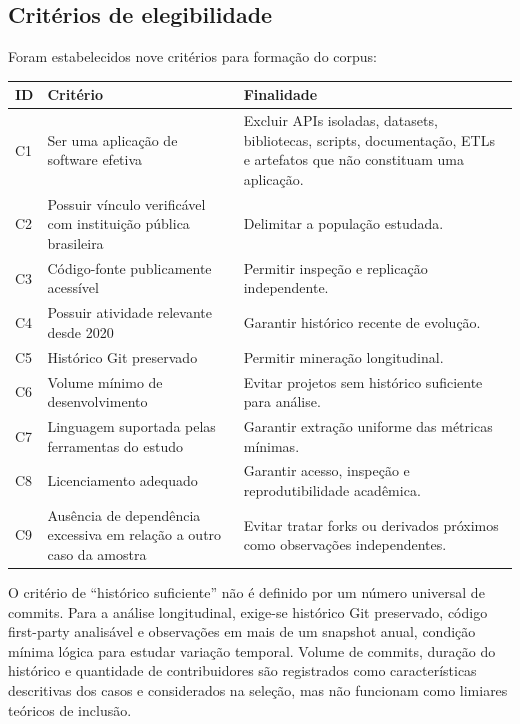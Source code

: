 \documentclass[12pt]{article}
\begin{document}
\subsection{Critérios de elegibilidade}

Foram estabelecidos nove critérios para formação do corpus:

\begin{longtable}{>{\raggedright\arraybackslash}p{1.2cm} >{\raggedright\arraybackslash}p{5.3cm} >{\raggedright\arraybackslash}p{8cm}}
\toprule
\textbf{ID} & \textbf{Critério} & \textbf{Finalidade} \\
\midrule
C1 & Ser uma aplicação de software efetiva & Excluir APIs isoladas, datasets, bibliotecas, scripts, documentação, ETLs e artefatos que não constituam uma aplicação. \\
C2 & Possuir vínculo verificável com instituição pública brasileira & Delimitar a população estudada. \\
C3 & Código-fonte publicamente acessível & Permitir inspeção e replicação independente. \\
C4 & Possuir atividade relevante desde 2020 & Garantir histórico recente de evolução. \\
C5 & Histórico Git preservado & Permitir mineração longitudinal. \\
C6 & Volume mínimo de desenvolvimento & Evitar projetos sem histórico suficiente para análise. \\
C7 & Linguagem suportada pelas ferramentas do estudo & Garantir extração uniforme das métricas mínimas. \\
C8 & Licenciamento adequado & Garantir acesso, inspeção e reprodutibilidade acadêmica. \\
C9 & Ausência de dependência excessiva em relação a outro caso da amostra & Evitar tratar forks ou derivados próximos como observações independentes. \\
\bottomrule
\end{longtable}

O critério de ``histórico suficiente'' não é definido por um número universal de commits. Para a análise longitudinal, exige-se histórico Git preservado, código first-party analisável e observações em mais de um snapshot anual, condição mínima lógica para estudar variação temporal. Volume de commits, duração do histórico e quantidade de contribuidores são registrados como características descritivas dos casos e considerados na seleção, mas não funcionam como limiares teóricos de inclusão.
\end{document}
